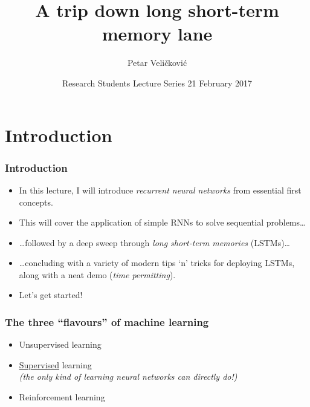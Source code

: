 \documentclass{beamer}
\title[Cross-modal convnets] 
{%
 {\bf A trip down long short-term memory lane}%
}
\author[Veli\v{c}kovi\'{c} et al.]
{
  Petar Veli\v{c}kovi\'{c}
}
\institute[CL]
{Artificial Intelligence Group\\
Computer Laboratory, University of Cambridge, UK}
\date[ARMRS2016]
{Research Students Lecture Series \hfill 21 February 2017}
\begin{document}
\begin{frame}
  \titlepage
\end{frame}

\section{Introduction}

\begin{frame}
	\frametitle{Introduction}
	\begin{itemize}
		\item In this lecture, I will introduce \emph{recurrent neural networks} from essential first concepts.
		\vfill
		\item This will cover the application of simple RNNs to solve sequential problems\dots
		\vfill
		\item \dots followed by a deep sweep through \emph{long short-term memories} (LSTMs)\dots
		\vfill
		\item \dots concluding with a variety of modern tips `n' tricks for deploying LSTMs, along with a neat demo (\emph{time permitting}).
		\vfill
		\item Let's get started!
	\end{itemize}
\end{frame}

\begin{frame}
	\frametitle{The three ``flavours'' of machine learning}
	\begin{itemize}
		\item Unsupervised learning
		\vfill
		\item \underline{Supervised} learning\\ \emph{(the only kind of learning neural networks can directly do!)}
		\vfill
		\item Reinforcement learning
	\end{itemize}
\end{frame}
\end{document}

